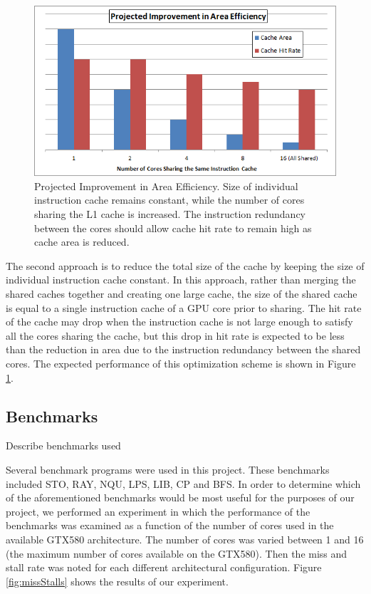 \begin{figure}[b!]
\centering
\includegraphics[width=\columnwidth]{graphics/AreaEff.png}
\caption{Projected Improvement in Area Efficiency. Size of individual instruction 
cache remains constant, while the number of cores sharing the L1 cache is increased.
The instruction redundancy between the cores should allow cache hit rate to remain
high as cache area is reduced. }
\label{AreaEff}
\end{figure}


The second approach is to reduce the total size of the cache by
keeping the size of individual instruction cache constant. 
In this approach, rather than merging the shared caches together and 
creating one large cache, the size of the shared cache is equal to 
a single instruction cache of a GPU core prior to sharing. 
The hit rate of the cache may drop when the instruction cache is not
large enough to satisfy all the cores sharing the cache, but this drop
in hit rate is expected to be less than the reduction in area due to
the instruction redundancy between the shared cores.
The expected performance of this optimization scheme is shown in Figure \ref{AreaEff}.


\subsection{Benchmarks}
Describe benchmarks used 

Several benchmark programs were used in this project. 
These benchmarks included STO, RAY, NQU, LPS, LIB, CP and BFS. 
In order to determine which of the aforementioned benchmarks would be
most useful for the purposes of our project, we performed an
experiment in which the performance of the benchmarks was examined as
a function of the number of cores used in the available GTX580
architecture. 
The number of cores was varied between 1 and 16 (the maximum number of
cores available on the GTX580). 
Then the miss and stall rate was noted for each different
architectural configuration. 
Figure \ref{fig:missStalls} shows the results of our experiment. 

